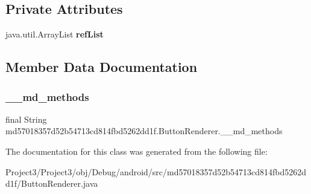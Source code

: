 \subsection*{Private Attributes}
\begin{DoxyCompactItemize}
\item 
\mbox{\label{classmd57018357d52b54713cd814fbd5262dd1f_1_1ButtonRenderer_a21d4015ec2fa37ea58626d27257f2727}} 
java.\+util.\+Array\+List {\bfseries ref\+List}
\end{DoxyCompactItemize}


\subsection{Member Data Documentation}
\mbox{\label{classmd57018357d52b54713cd814fbd5262dd1f_1_1ButtonRenderer_a07d67ace7550d930955ba79206673c60}} 
\subsubsection{\texorpdfstring{\+\_\+\+\_\+md\+\_\+methods}{\_\_md\_methods}}
{\footnotesize\ttfamily final String md57018357d52b54713cd814fbd5262dd1f.\+Button\+Renderer.\+\_\+\+\_\+md\+\_\+methods\hspace{0.3cm}{\ttfamily [static]}}



The documentation for this class was generated from the following file\+:\begin{DoxyCompactItemize}
\item 
Project3/\+Project3/obj/\+Debug/android/src/md57018357d52b54713cd814fbd5262dd1f/Button\+Renderer.\+java\end{DoxyCompactItemize}
